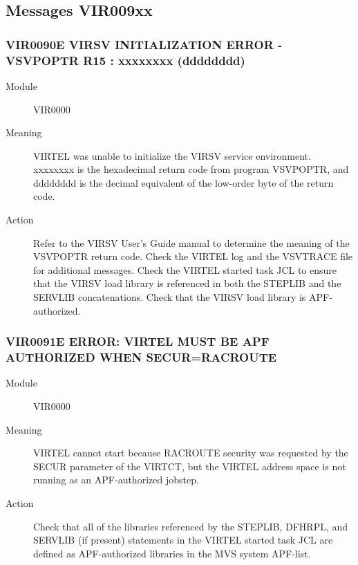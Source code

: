 \documentclass[letterpaper,10pt,english]{sphinxmanual}
\begin{document}
\subsection{Messages VIR009xx}
\label{\detokenize{messages:messages-vir009xx}}

\subsubsection{VIR0090E VIRSV INITIALIZATION ERROR -VSVPOPTR R15 : xxxxxxxx (dddddddd)}
\label{\detokenize{messages:vir0090e-virsv-initialization-error-vsvpoptr-r15-xxxxxxxx-dddddddd}}\begin{description}
\item[{Module}] \leavevmode
VIR0000

\item[{Meaning}] \leavevmode
VIRTEL was unable to initialize the VIRSV service environment. xxxxxxxx is the hexadecimal return code from program VSVPOPTR, and dddddddd is the decimal equivalent of the low-order byte of the return code.

\item[{Action}] \leavevmode
Refer to the VIRSV User’s Guide manual to determine the meaning of the VSVPOPTR return code. Check the VIRTEL log and the VSVTRACE file for additional messages. Check the VIRTEL started task JCL to ensure that the VIRSV load library is referenced in both the STEPLIB and the SERVLIB concatenations. Check that the VIRSV load library is APF- authorized.

\end{description}


\subsubsection{VIR0091E ERROR: VIRTEL MUST BE APF AUTHORIZED WHEN SECUR=RACROUTE}
\label{\detokenize{messages:vir0091e-error-virtel-must-be-apf-authorized-when-secur-racroute}}\begin{description}
\item[{Module}] \leavevmode
VIR0000

\item[{Meaning}] \leavevmode
VIRTEL cannot start because RACROUTE security was requested by the SECUR parameter of the VIRTCT, but the VIRTEL address space is not running as an APF-authorized jobstep.

\item[{Action}] \leavevmode
Check that all of the libraries referenced by the STEPLIB, DFHRPL, and SERVLIB (if present) statements in the VIRTEL started task JCL are defined as APF-authorized libraries in the MVS system APF-list.

\end{description}
\end{document}
